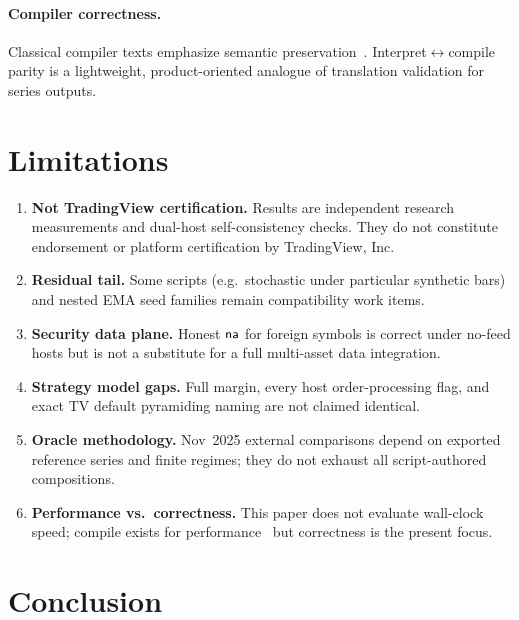 \documentclass[11pt,a4paper]{article}
\begin{document}
\paragraph{Compiler correctness.}
Classical compiler texts emphasize semantic preservation~\citep{aho2006dragon,appeli1997modern}.
Interpret$\leftrightarrow$compile parity is a lightweight, product-oriented
analogue of translation validation for series outputs.

\section{Limitations}
\label{sec:limits}

\begin{enumerate}[leftmargin=*]
  \item \textbf{Not TradingView certification.}
    Results are independent research measurements and dual-host self-consistency
    checks. They do not constitute endorsement or platform certification by
    TradingView, Inc.
  \item \textbf{Residual  tail.}
    Some scripts (e.g.\ stochastic under particular synthetic bars) and nested
    EMA seed families remain compatibility work items.
  \item \textbf{Security data plane.}
    Honest $\textsf{na}$ for foreign symbols is correct under no-feed hosts but is not
    a substitute for a full multi-asset data integration.
  \item \textbf{Strategy model gaps.}
    Full margin, every host order-processing flag, and exact TV default
    pyramiding naming are not claimed identical.
  \item \textbf{Oracle methodology.}
    Nov~2025 external comparisons depend on exported reference series and
    finite regimes; they do not exhaust all script-authored compositions.
  \item \textbf{Performance vs.\ correctness.}
    This paper does not evaluate wall-clock speed; compile exists for
    performance~\citep{lam2015numba} but correctness is the present focus.
\end{enumerate}

\section{Conclusion}
\label{sec:concl}
\end{document}

